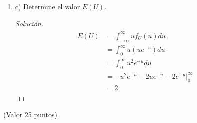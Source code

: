 \documentclass[a4paper,12pt]{article}
\newenvironment{solution}
  {\renewcommand\qedsymbol{$\blacksquare$}\begin{proof}[Solución]}
  {\end{proof}}
\begin{document}
\begin{enumerate}
\begin{solution}
    \end{solution}
    \item c) Determine el valor $E(U)$. 
    \begin{solution}
    \begin{align}
\begin{aligned}
E(U) &=\int_{-\infty}^{\infty} u f_{U}(u) d u \\
&=\int_{0}^{\infty} u\left(u e^{-u}\right) d u\\
&=\int_{0}^{\infty} u^{2} e^{-u} d u \\
&=-u^{2} e^{-u}-2 u e^{-u}-\left.2 e^{-u}\right|_{0} ^{\infty}\\
&=2
\end{aligned}
\end{align}
    \end{solution}
\end{enumerate}



(Valor 25 puntos).
\end{document}
